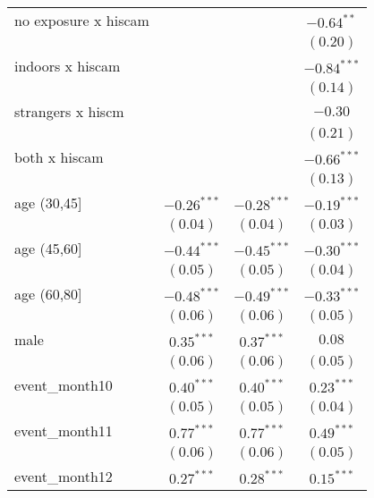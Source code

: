 \begin{table}
\begin{center}
\begin{tabular}{l c c c}
no exposure x hiscam             &               &               & $-0.64^{**}$  \\
                                 &               &               & $(0.20)$      \\
indoors x hiscam                 &               &               & $-0.84^{***}$ \\
                                 &               &               & $(0.14)$      \\
strangers x hiscm                &               &               & $-0.30$       \\
                                 &               &               & $(0.21)$      \\
both x hiscam                    &               &               & $-0.66^{***}$ \\
                                 &               &               & $(0.13)$      \\
age (30,45]                      & $-0.26^{***}$ & $-0.28^{***}$ & $-0.19^{***}$ \\
                                 & $(0.04)$      & $(0.04)$      & $(0.03)$      \\
age (45,60]                      & $-0.44^{***}$ & $-0.45^{***}$ & $-0.30^{***}$ \\
                                 & $(0.05)$      & $(0.05)$      & $(0.04)$      \\
age (60,80]                      & $-0.48^{***}$ & $-0.49^{***}$ & $-0.33^{***}$ \\
                                 & $(0.06)$      & $(0.06)$      & $(0.05)$      \\
male                             & $0.35^{***}$  & $0.37^{***}$  & $0.08$        \\
                                 & $(0.06)$      & $(0.06)$      & $(0.05)$      \\
event\_month10                   & $0.40^{***}$  & $0.40^{***}$  & $0.23^{***}$  \\
                                 & $(0.05)$      & $(0.05)$      & $(0.04)$      \\
event\_month11                   & $0.77^{***}$  & $0.77^{***}$  & $0.49^{***}$  \\
                                 & $(0.06)$      & $(0.06)$      & $(0.05)$      \\
event\_month12                   & $0.27^{***}$  & $0.28^{***}$  & $0.15^{***}$  \\

\end{tabular}
\end{center}
\end{table}
